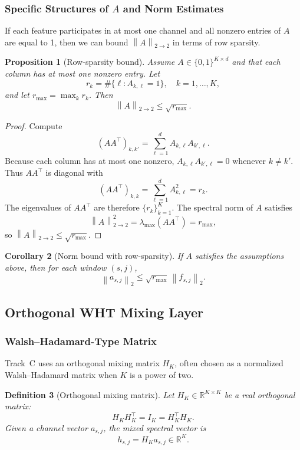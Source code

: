 \documentclass[11pt]{article}
\newtheorem{definition}{Definition}[section]
\newtheorem{proposition}[definition]{Proposition}
\newtheorem{corollary}[definition]{Corollary}
\newcommand{\R}{\mathbb{R}}
\newcommand{\norm}[1]{\left\lVert #1 \right\rVert}
\begin{document}
\subsubsection{Specific Structures of \texorpdfstring{$A$}{A} and Norm Estimates}

If each feature participates in at most one channel and all nonzero entries of \(A\) are equal to 1, then we can bound \(\norm{A}_{2\to2}\) in terms of row sparsity.

\begin{proposition}[Row-sparsity bound]
Assume \(A \in \{0,1\}^{K \times d}\) and that each column has at most one nonzero entry.
Let
\[
  r_k = \#\{ \ell : A_{k,\ell} = 1 \}, \quad k=1,\dots,K,
\]
and let \(r_{\max} = \max_k r_k\).
Then
\[
  \norm{A}_{2\to2} \le \sqrt{r_{\max}}.
\]
\end{proposition}

\begin{proof}
Compute
\[
  (A A^\top)_{k,k'} = \sum_{\ell=1}^d A_{k,\ell} A_{k',\ell}.
\]
Because each column has at most one nonzero, \(A_{k,\ell} A_{k',\ell} = 0\) whenever \(k \ne k'\).
Thus \(A A^\top\) is diagonal with
\[
  (A A^\top)_{k,k} = \sum_{\ell=1}^d A_{k,\ell}^2 = r_k.
\]
The eigenvalues of \(A A^\top\) are therefore \(\{r_k\}_{k=1}^K\).
The spectral norm of \(A\) satisfies
\[
  \norm{A}_{2\to2}^2 = \lambda_{\max}(A A^\top) = r_{\max},
\]
so \(\norm{A}_{2\to2} \le \sqrt{r_{\max}}\).
\end{proof}

\begin{corollary}[Norm bound with row-sparsity]
If \(A\) satisfies the assumptions above, then for each window \((s,j)\),
\[
  \norm{a_{s,j}}_2 \le \sqrt{r_{\max}} \,\norm{f_{s,j}}_2.
\]
\end{corollary}

\subsection{Orthogonal WHT Mixing Layer}

\subsubsection{Walsh--Hadamard-Type Matrix}

Track~C uses an orthogonal mixing matrix \(H_K\), often chosen as a normalized Walsh--Hadamard matrix when \(K\) is a power of two.

\begin{definition}[Orthogonal mixing matrix]
Let \(H_K \in \R^{K \times K}\) be a real orthogonal matrix:
\[
  H_K H_K^\top = I_K = H_K^\top H_K.
\]
Given a channel vector \(a_{s,j}\), the mixed spectral vector is
\[
  h_{s,j} = H_K a_{s,j} \in \R^K.
\]
\end{definition}
\end{document}
